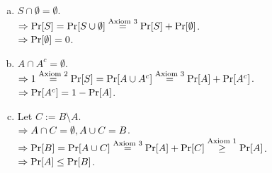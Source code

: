 \begin{pr}$ $
\begin{enumerate}[(a)]
\item $S\cap\emptyset=\emptyset$.\\
$\Rightarrow\mathrm{Pr}[S]=\mathrm{Pr}[S\cup\emptyset]\overset{\text{Axiom 3}}=\mathrm{Pr}[S]+\mathrm{Pr}[\emptyset]$.\\
$\Rightarrow\mathrm{Pr}[\emptyset]=0$.
\item $A\cap A^c=\emptyset$.\\
$\Rightarrow1\overset{\text{Axiom 2}}=\mathrm{Pr}[S]=\mathrm{Pr}[A\cup A^c]\overset{\text{Axiom 3}}=\mathrm{Pr}[A]+\mathrm{Pr}[A^c]$.\\
$\Rightarrow\mathrm{Pr}[A^c]=1-\mathrm{Pr}[A]$.
\item Let $C:=B\setminus A$.\\
$\Rightarrow A\cap C=\emptyset, A\cup C=B$.\\
$\Rightarrow\mathrm{Pr}[B]=\mathrm{Pr}[A\cup C]\overset{\text{Axiom 3}}=\mathrm{Pr}[A]+\mathrm{Pr}[C]\overset{\text{Axiom 1}}\geq\mathrm{Pr}[A]$.\\
$\Rightarrow\mathrm{Pr}[A]\leq\mathrm{Pr}[B]$.
\end{enumerate}
\end{pr}
